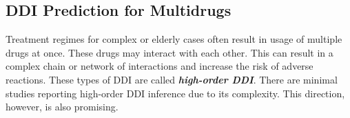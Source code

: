 \documentclass[11pt,a4paper]{article}
\begin{document}
\subsection{DDI Prediction for Multidrugs}
Treatment regimes for complex or elderly cases often result in usage of multiple drugs at once. These drugs may interact with each other. This can result in a complex chain or network of interactions and increase the risk of adverse reactions. These types of DDI are called \textbf{\textit{high-order DDI}}. There are minimal studies reporting high-order DDI inference due to its complexity. This direction, however, is also promising.



\printbibliography
\end{document}
